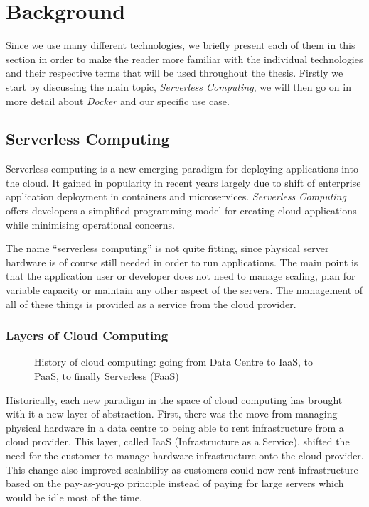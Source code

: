 \chapter{Background}
\label{sec:background}

Since we use many different technologies, we briefly present each of them in this section in order
to make the reader more familiar with the individual technologies and their respective terms that
will be used throughout the thesis. Firstly we start by discussing the main topic,
\textit{Serverless Computing}, we will then go on in more detail about \textit{Docker} and our
specific use case.

\section{Serverless Computing}

Serverless computing is a new emerging paradigm for deploying applications into the cloud. It gained
in popularity in recent years largely due to shift of enterprise application deployment in
containers and microservices. \textit{Serverless Computing} offers developers a simplified
programming model for creating cloud applications while minimising operational concerns.
\cite{servprog}

The name “serverless computing” is not quite fitting, since physical server hardware is of course
still needed in order to run applications. The main point is that the application user or developer
does not need to manage scaling, plan for variable capacity or maintain any other aspect of the
servers. The management of all of these things is provided as a service from the cloud provider.
\cite{wikiservcomp}

\subsection{Layers of Cloud Computing}

\begin{figure}[H]
  \centering
  \caption{History of cloud computing: going from Data Centre to IaaS, to PaaS, to finally
  Serverless (FaaS) \cite{layercloudcomp}}
\end{figure}

Historically, each new paradigm in the space of cloud computing has brought with it a new layer of
abstraction. First, there was the move from managing physical hardware in a data centre to being
able to rent infrastructure from a cloud provider. This layer, called IaaS (Infrastructure as a
Service), shifted the need for the customer to manage hardware infrastructure onto the cloud
provider. This change also improved scalability as customers could now rent infrastructure based on
the pay-as-you-go principle instead of paying for large servers which would be idle most of the
time.


